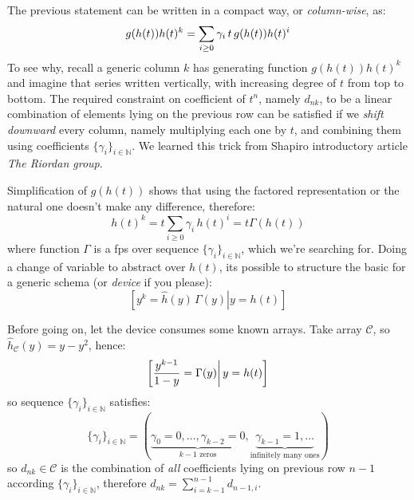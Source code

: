 The previous statement can be written in a compact way, or \emph{column-wise}, as:
\begin{displaymath}
    g(h(t))h(t)^k = \sum_{i\geq0}{\gamma_i\,t\,g(h(t)) h(t)^i}\\
\end{displaymath}
To see why, recall a generic column 
$k$ has generating function $g(h(t))h(t)^k$ and imagine that series written vertically, 
with increasing degree of $t$ from top to bottom.
The required constraint on coefficient of $t^n$, namely $d_{nk}$, 
to be a linear combination of elements lying on the previous row 
can be satisfied if we \emph{shift downward} every column,
namely multiplying each one by $t$, and combining them using coefficients
$\lbrace \gamma_{i} \rbrace_{i\in\mathbb{N}}$. 
We learned this trick from Shapiro introductory article \emph{The Riordan group}.

Simplification of $g(h(t))$ shows that using the factored representation or
the natural one doesn't make any difference, therefore:
\begin{displaymath}
    h(t)^k = t \sum_{i\geq 0}{\gamma_i\,h(t)^i} = t \Gamma(h(t))
\end{displaymath}
where function $\Gamma$ is a \ac{fps} over sequence 
$\lbrace \gamma_{i} \rbrace_{i\in\mathbb{N}}$, which we're searching for.
Doing a change of variable to abstract over $h(t)$, its possible to
structure the basic for a generic schema (or \emph{device} if you please):
\begin{displaymath}
    \left.\left[y^{k} = \hat{h}(y)\,\Gamma(y) \right| y = h(t) \right]
\end{displaymath}

Before going on, let the device consumes some known arrays. Take 
array $\mathcal{C}$, so $\hat{h}_{\mathcal{C}}(y) = y-y^2$, hence:
\begin{displaymath}
    \left.\left[\frac{y^{k-1}}{1-y} =  \Gamma(y) \right| y = h(t) \right]\\
\end{displaymath}
so sequence $\lbrace \gamma_{i} \rbrace_{i\in\mathbb{N}}$ satisfies:
\begin{displaymath}
    \lbrace \gamma_{i} \rbrace_{i\in\mathbb{N}} = 
        \left(\underbrace{\gamma_{0}=0,\ldots,\gamma_{k-2}=0}_{k-1 \text{ zeros}},
            \underbrace{\gamma_{k-1}=1, \ldots}_{\text{infinitely many ones}} \right)
\end{displaymath}
so $d_{nk}\in\mathcal{C}$ is the combination of \emph{all} coefficients
lying on previous row $n-1$ according $\lbrace \gamma_{i} \rbrace_{i\in\mathbb{N}}$,
therefore $d_{nk}=\sum_{i=k-1}^{n-1}{d_{n-1,i}}$.


